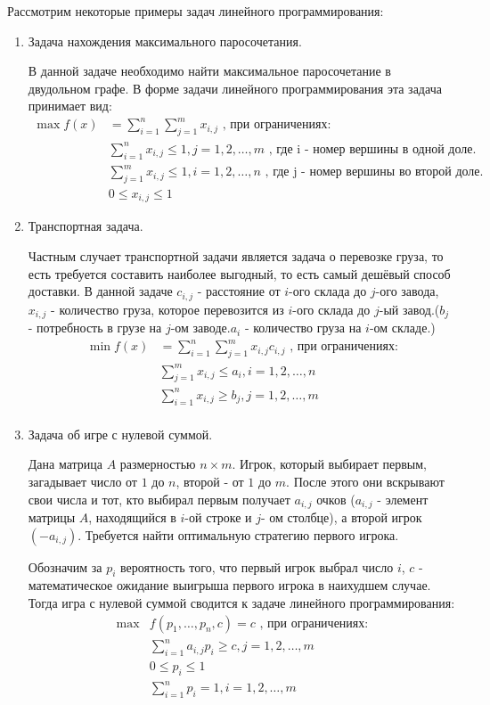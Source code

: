 \documentclass[12pt,a4paper]{article}
\begin{document}


\newpage
Рассмотрим некоторые примеры задач линейного программирования:\par
\begin{enumerate}
\item Задача нахождения максимального паросочетания.\par
	В данной задаче необходимо найти максимальное паросочетание в двудольном графе. В форме задачи линейного 		программирования эта задача принимает вид: 
	\[
	\begin{aligned}
	\max f(x)&=
	\sum_{i=1}^n \sum_{j=1}^m x_{i,j} \text{ , при ограничениях:} \\
	&\sum_{i=1}^n x_{i,j} \leqslant 1, j=1,2,\dots,m \text{ , где i - номер вершины в одной доле.}\\
	&\sum_{j=1}^m x_{i,j} \leqslant 1, i=1,2,\dots,n \text{ , где j - номер вершины во второй доле.}\\
	&0 \leqslant x_{i,j} \leqslant 1
	\end{aligned}
	\]
\item Транспортная задача.\par
	Частным случает транспортной задачи является задача о перевозке груза, то есть требуется составить наиболее 		выгодный, то есть самый дешёвый способ доставки. В данной задаче $ c_{i,j}$ - расстояние от $i$-ого склада до $j$-ого завода, $x_{i,j}$ - количество груза, которое перевозится из  $i$-ого склада до $j$-ый завод.($b_{j}$ - потребность в грузе на $j$-ом заводе.$a_{i}$ - количество груза на $i$-ом складе.)
	\[
	\begin{aligned}
	\min f(x)&=
	\sum_{i=1}^n \sum_{j=1}^m x_{i,j} c_{i,j} \text{ , при ограничениях:}\\
	&\sum_{j=1}^m x_{i,j} \leqslant a_{i}, i=1,2,\dots,n \\
	&\sum_{i=1}^n x_{i,j} \geqslant b_{j}, j=1,2,\dots,m \\
	\end{aligned}
	\]
\item Задача об игре с нулевой суммой.\par
	Дана матрица $A$ размерностью $n \times m$. Игрок, который выбирает первым, загадывает число от $1$ до $n$, второй - от $1$ до $m$. После этого они вскрывают свои числа и тот, кто выбирал первым получает $a_{i,j}$ очков ($a_{i,j}$ - элемент матрицы $A$, находящийся в $i$-ой строке и $j$- ом столбце), а второй игрок $(-a_{i,j})$. Требуется найти оптимальную стратегию первого игрока.\par
	Обозначим за $p_{i}$ вероятность того, что первый игрок выбрал число $i$, $c$ - математическое ожидание выигрыша первого игрока в наихудшем случае. Тогда игра с нулевой суммой сводится к задаче линейного программирования:
	\[
	\begin{aligned}
	\max &f( p_{1},\dots, p_{n},c)=c  \text{ , при ограничениях:}\\
	&\sum_{i=1}^n a_{i,j} p_{i}\geqslant c, j=1,2,\dots,m \\
	&0 \leqslant p_{i} \leqslant 1 \\
	&\sum_{i=1}^n p_{i} = 1, i=1,2,\dots,m \\
	\end{aligned}
	\]
\end{enumerate}
\end{document}
